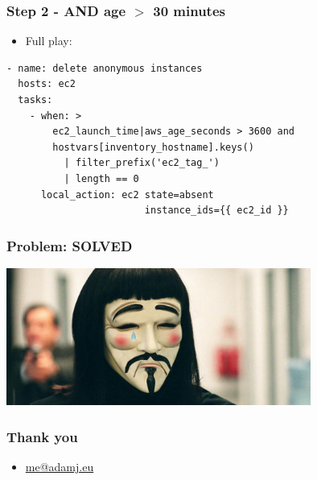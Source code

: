 \documentclass{beamer}
\begin{document}
\begin{frame}[fragile]\frametitle{Step 2 - AND age $>$ 30 minutes}

    \begin{itemize}
        \item Full play:
    \end{itemize}

    \begin{lstlisting}
- name: delete anonymous instances
  hosts: ec2
  tasks:
    - when: >
        ec2_launch_time|aws_age_seconds > 3600 and
        hostvars[inventory_hostname].keys()
          | filter_prefix('ec2_tag_')
          | length == 0
      local_action: ec2 state=absent
                        instance_ids={{ ec2_id }}
    \end{lstlisting}

\end{frame}


\begin{frame}\frametitle{Problem: \textbf{SOLVED}}

    \begin{center}
        \includegraphics[width=10cm]{sad-anonymous}
    \end{center}

\end{frame}


\begin{frame}\frametitle{Thank you}

    \begin{itemize}
        \item \url{me@adamj.eu}
    \end{itemize}

\end{frame}
\end{document}
